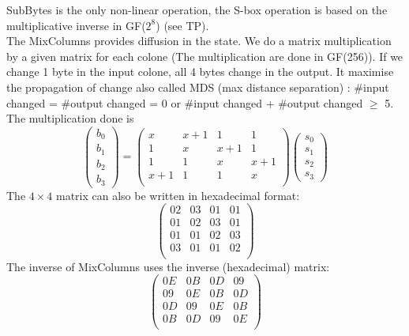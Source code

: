 \documentclass[11pt,a4paper]{report}
\begin{document}
SubBytes is the only non-linear operation, the S-box operation is based on the multiplicative inverse in GF($2^8$) (see TP).\\
The MixColumns provides diffusion in the state. We do a matrix multiplication by a given matrix for each colone (The multiplication are done in GF(256)). If we change 1 byte in the input colone, all 4 bytes change in the output. It maximise the propagation of change also called MDS (max distance separation) : $\#$input changed = $\#$output changed = 0 or $\#$input changed + $\#$output changed $\geq$ 5. The multiplication done is\\
$$\left(\begin{array}{c}
b_0 \\ b_1 \\ b_2 \\ b_3
\end{array}\right) = 
\left(\begin{array}{cccc}
x & x+1 & 1 & 1\\  
1 & x & x+1 & 1\\  
1 & 1 & x & x+1\\  
x+1 & 1 & 1 & x\\  
\end{array}\right)\left(\begin{array}{c}
s_0 \\ s_1 \\ s_2 \\ s_3
\end{array}\right)$$
The $4\times 4$ matrix can also be written in hexadecimal format:
$$\left(\begin{array}{cccc}
02 & 03 & 01 & 01\\  
01 & 02 & 03 & 01\\  
01 & 01 & 02 & 03\\  
03 & 01 & 01 & 02\\  
\end{array}\right)$$
The inverse of MixColumns uses the inverse (hexadecimal) matrix:
$$\left(\begin{array}{cccc}
0E & 0B & 0D & 09\\  
09 & 0E & 0B & 0D\\  
0D & 09 & 0E & 0B\\  
0B & 0D & 09 & 0E\\  
\end{array}\right)$$
\end{document}
